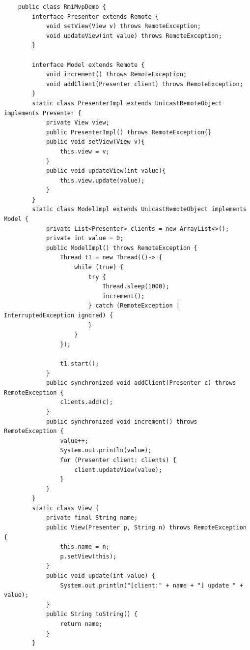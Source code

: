 \begin{verbatim}
    public class RmiMvpDemo {
        interface Presenter extends Remote {
            void setView(View v) throws RemoteException;
            void updateView(int value) throws RemoteException;
        }

        interface Model extends Remote {
            void increment() throws RemoteException;
            void addClient(Presenter client) throws RemoteException;
        }
        static class PresenterImpl extends UnicastRemoteObject implements Presenter {
            private View view;
            public PresenterImpl() throws RemoteException{}
            public void setView(View v){
                this.view = v;
            }
            public void updateView(int value){
                this.view.update(value);
            }
        }
        static class ModelImpl extends UnicastRemoteObject implements Model {
            private List<Presenter> clients = new ArrayList<>();
            private int value = 0;
            public ModelImpl() throws RemoteException {
                Thread t1 = new Thread(()-> {
                    while (true) {
                        try {
                            Thread.sleep(1000);
                            increment();
                        } catch (RemoteException | InterruptedException ignored) {
                        }
                    }
                });

                t1.start();
            }
            public synchronized void addClient(Presenter c) throws RemoteException {
                clients.add(c);
            }
            public synchronized void increment() throws RemoteException {
                value++;
                System.out.println(value);
                for (Presenter client: clients) {
                    client.updateView(value);
                }
            }
        }
        static class View {
            private final String name;
            public View(Presenter p, String n) throws RemoteException {
                this.name = n;
                p.setView(this);
            }
            public void update(int value) {
                System.out.println("[client:" + name + "] update " + value);
            }
            public String toString() {
                return name;
            }
        }


\end{verbatim}
